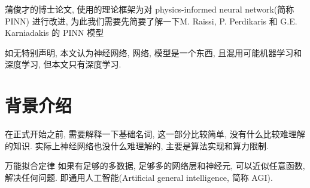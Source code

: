 蒲俊才的博士论文\cite{pu-thesis}, 使用的理论框架为对 physics-informed neural network(简称 PINN) 进行改进, 为此我们需要先简要了解一下M. Raissi, P. Perdikaris 和 G.E. Karniadakis 的 PINN 模型\cite{PINN}
\begin{remark}
    如无特别声明, 本文认为神经网络, 网络, 模型是一个东西, 且混用可能机器学习和深度学习, 但本文只有深度学习. 
\end{remark}

\section{背景介绍}
在正式开始之前, 需要解释一下基础名词, 这一部分比较简单, 没有什么比较难理解的知识. 实际上神经网络也没什么难理解的, 主要是算法实现和算力限制. 
\begin{definition}{万能拟合定律}
    如果有足够的多数据, 足够多的网络层和神经元, 可以近似任意函数, 解决任何问题. 即通用人工智能(Artificial general intelligence, 简称 AGI). 
\end{definition}

